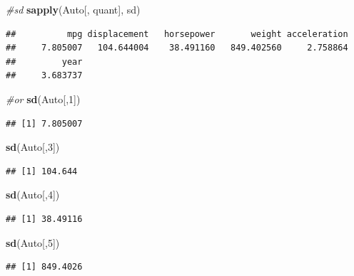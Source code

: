 \documentclass[]{article}
\newenvironment{Shaded}{\begin{snugshade}}{\end{snugshade}}
\newcommand{\KeywordTok}[1]{\textcolor[rgb]{0.13,0.29,0.53}{\textbf{#1}}}
\newcommand{\DecValTok}[1]{\textcolor[rgb]{0.00,0.00,0.81}{#1}}
\newcommand{\CommentTok}[1]{\textcolor[rgb]{0.56,0.35,0.01}{\textit{#1}}}
\newcommand{\NormalTok}[1]{#1}
\begin{document}
\begin{Shaded}
\begin{Highlighting}[]
\CommentTok{#sd}
\KeywordTok{sapply}\NormalTok{(Auto[, quant], sd)}
\end{Highlighting}
\end{Shaded}

\begin{verbatim}
##          mpg displacement   horsepower       weight acceleration 
##     7.805007   104.644004    38.491160   849.402560     2.758864 
##         year 
##     3.683737
\end{verbatim}

\begin{Shaded}
\begin{Highlighting}[]
\CommentTok{#or}
\KeywordTok{sd}\NormalTok{(Auto[,}\DecValTok{1}\NormalTok{])}
\end{Highlighting}
\end{Shaded}

\begin{verbatim}
## [1] 7.805007
\end{verbatim}

\begin{Shaded}
\begin{Highlighting}[]
\KeywordTok{sd}\NormalTok{(Auto[,}\DecValTok{3}\NormalTok{])}
\end{Highlighting}
\end{Shaded}

\begin{verbatim}
## [1] 104.644
\end{verbatim}

\begin{Shaded}
\begin{Highlighting}[]
\KeywordTok{sd}\NormalTok{(Auto[,}\DecValTok{4}\NormalTok{])}
\end{Highlighting}
\end{Shaded}

\begin{verbatim}
## [1] 38.49116
\end{verbatim}

\begin{Shaded}
\begin{Highlighting}[]
\KeywordTok{sd}\NormalTok{(Auto[,}\DecValTok{5}\NormalTok{])}
\end{Highlighting}
\end{Shaded}

\begin{verbatim}
## [1] 849.4026
\end{verbatim}
\end{document}

